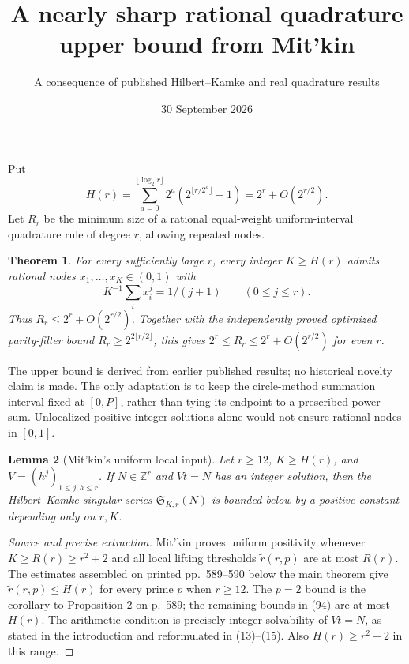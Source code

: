 \documentclass[11pt]{article}
\title{A nearly sharp rational quadrature upper bound from Mit'kin}
\author{A consequence of published Hilbert--Kamke and real quadrature results}
\date{30 September 2026}
\newtheorem{theorem}{Theorem}
\newtheorem{lemma}[theorem]{Lemma}
\newcommand{\Z}{\mathbb Z}
\begin{document}
\maketitle
Put
\[
 H(r)=\sum_{a=0}^{\lfloor\log_2r\rfloor}
 2^a(2^{\lfloor r/2^a\rfloor}-1)=2^r+O(2^{r/2}).
\]
Let $R_r$ be the minimum size of a rational equal-weight uniform-interval
quadrature rule of degree $r$, allowing repeated nodes.
\begin{theorem}\label{main}
For every sufficiently large $r$, every integer $K\ge H(r)$ admits
rational nodes $x_1,\ldots,x_K\in(0,1)$ with
\[
 K^{-1}\sum_i x_i^j=1/(j+1)\qquad(0\le j\le r).
\]
Thus $R_r\le2^r+O(2^{r/2})$. Together with the independently proved
optimized parity-filter bound $R_r\ge2^{2\lfloor r/2\rfloor}$,
this gives $2^r\le R_r\le2^r+O(2^{r/2})$ for even $r$.
\end{theorem}
The upper bound is derived from earlier published results; no historical
novelty claim is made. The only adaptation is to keep the circle-method
summation interval fixed at $[0,P]$, rather than tying its endpoint to a
prescribed power sum. Unlocalized positive-integer solutions alone
would not ensure rational nodes in $[0,1]$.

\begin{lemma}[Mit'kin's uniform local input]\label{local}
Let $r\ge12$, $K\ge H(r)$, and $V=(h^j)_{1\le j,h\le r}$.
If $N\in\Z^r$ and $Vt=N$ has an integer solution, then the
Hilbert--Kamke singular series $\mathfrak S_{K,r}(N)$ is bounded below
by a positive constant depending only on $r,K$.
\end{lemma}
\begin{proof}[Source and precise extraction]
Mit'kin \cite[Lemma 15, printed p.~577]{mitkin} proves uniform positivity
whenever $K\ge R(r)\ge r^2+2$ and all local lifting thresholds
$\widetilde r(r,p)$ are at most $R(r)$. The estimates assembled on
printed pp.~589--590 below the main theorem give
$\widetilde r(r,p)\le H(r)$ for every prime $p$ when $r\ge12$.
The $p=2$ bound is the corollary to Proposition 2 on p.~589; the
remaining bounds in (94) are at most $H(r)$.
The arithmetic condition is precisely integer solvability of $Vt=N$,
as stated in the introduction and reformulated in (13)--(15).
Also $H(r)\ge r^2+2$ in this range.
\end{proof}
\end{document}

